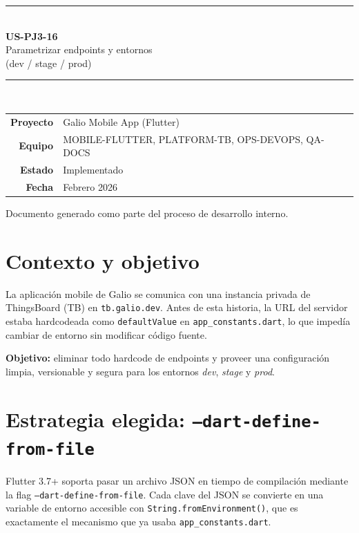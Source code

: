 \documentclass[12pt, a4paper]{article}
\begin{document}
\begin{titlepage}
  \centering
  \vspace*{3cm}
  {\color{galiogreen}\rule{\linewidth}{2pt}}\\[0.5cm]
  {\LARGE\bfseries US-PJ3-16}\\[0.3cm]
  {\Large Parametrizar endpoints y entornos\\(dev / stage / prod)}\\[0.3cm]
  {\color{galiogreen}\rule{\linewidth}{2pt}}\\[1cm]
  \begin{tabular}{rl}
    \textbf{Proyecto}   & Galio Mobile App (Flutter) \\
    \textbf{Equipo}     & MOBILE-FLUTTER, PLATFORM-TB, OPS-DEVOPS, QA-DOCS \\
    \textbf{Estado}     & Implementado \\
    \textbf{Fecha}      & Febrero 2026 \\
  \end{tabular}
  \vfill
  {\color{galiogray}\small Documento generado como parte del proceso de desarrollo interno.}
\end{titlepage}

\section{Contexto y objetivo}

La aplicación mobile de Galio se comunica con una instancia privada de
ThingsBoard (TB) en \texttt{tb.galio.dev}. Antes de esta historia, la URL del
servidor estaba hardcodeada como \texttt{defaultValue} en
\texttt{app\_constants.dart}, lo que impedía cambiar de entorno sin modificar
código fuente.

\textbf{Objetivo:} eliminar todo hardcode de endpoints y proveer una
configuración limpia, versionable y segura para los entornos
\textit{dev}, \textit{stage} y \textit{prod}.

\section{Estrategia elegida: \texttt{--dart-define-from-file}}

Flutter 3.7+ soporta pasar un archivo JSON en tiempo de compilación mediante
la flag \texttt{--dart-define-from-file}. Cada clave del JSON se convierte en
una variable de entorno accesible con \texttt{String.fromEnvironment()}, que
es exactamente el mecanismo que ya usaba \texttt{app\_constants.dart}.
\end{document}
